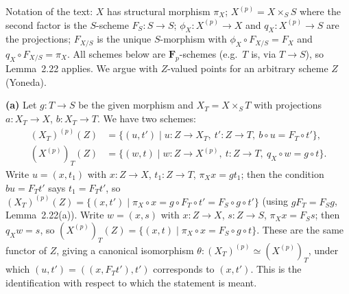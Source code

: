 \documentclass[11pt]{article}
\begin{document}
\pf
Notation of the text: $X$ has structural morphism $\pi_X$; $X^{(p)}=X\times_{S}S$ where the second factor is the $S$-scheme $F_S:S\to S$; $\phi_X:X^{(p)}\to X$ and $q_X:X^{(p)}\to S$ are the projections; $F_{X/S}$ is the unique $S$-morphism with $\phi_X\circ F_{X/S}=F_X$ and $q_X\circ F_{X/S}=\pi_X$. All schemes below are $\mathbf F_p$-schemes (e.g.\ $T$ is, via $T\to S$), so Lemma~2.22 applies. We argue with $Z$-valued points for an arbitrary scheme $Z$ (Yoneda).

\textbf{(a)} Let $g:T\to S$ be the given morphism and $X_T=X\times_ST$ with projections $a:X_T\to X$, $b:X_T\to T$. We have two schemes:
\begin{align*}
(X_T)^{(p)}(Z)&=\{(u,t')\mid u:Z\to X_T,\ t':Z\to T,\ b\circ u=F_T\circ t'\},\\
(X^{(p)})_T(Z)&=\{(w,t)\mid w:Z\to X^{(p)},\ t:Z\to T,\ q_X\circ w=g\circ t\}.
\end{align*}
Write $u=(x,t_1)$ with $x:Z\to X$, $t_1:Z\to T$, $\pi_Xx=gt_1$; then the condition $b u=F_Tt'$ says $t_1=F_Tt'$, so $(X_T)^{(p)}(Z)=\{(x,t')\mid\pi_X\circ x=g\circ F_T\circ t'=F_S\circ g\circ t'\}$ (using $gF_T=F_Sg$, Lemma~2.22(a)). Write $w=(x,s)$ with $x:Z\to X$, $s:Z\to S$, $\pi_Xx=F_Ss$; then $q_Xw=s$, so $(X^{(p)})_T(Z)=\{(x,t)\mid\pi_X\circ x=F_S\circ g\circ t\}$. These are the same functor of $Z$, giving a canonical isomorphism $\theta:(X_T)^{(p)}\simeq(X^{(p)})_T$, under which $(u,t')=((x,F_Tt'),t')$ corresponds to $(x,t')$. This is the identification with respect to which the statement is meant.
\end{document}
